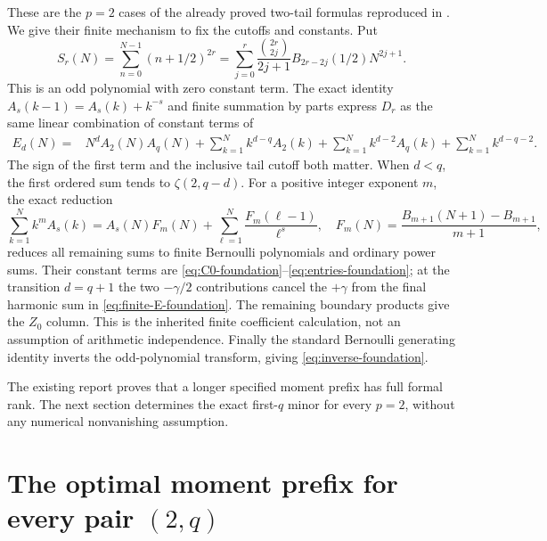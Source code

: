 \documentclass[11pt,a4paper]{article}
\numberwithin{equation}{section}
\theoremstyle{plain}
\theoremstyle{definition}
\theoremstyle{remark}
\begin{document}
These are the $p=2$ cases of the already proved two-tail formulas
reproduced in \cite[Section 7]{CanonicalFifth}. We give their finite
mechanism to fix the cutoffs and constants. Put
\[
 S_r(N)=\sum_{n=0}^{N-1}(n+1/2)^{2r}
       =\sum_{j=0}^r\frac{\binom{2r}{2j}}{2j+1}
                        B_{2r-2j}(1/2)N^{2j+1}.
\]
This is an odd polynomial with zero constant term. The exact identity
$A_s(k-1)=A_s(k)+k^{-s}$ and finite summation by parts express $D_r$
as the same linear combination of constant terms of
\begin{align}\label{eq:finite-E-foundation}
 E_d(N)={}&N^dA_2(N)A_q(N)
 +\sum_{k=1}^N k^{d-q}A_2(k)
 +\sum_{k=1}^N k^{d-2}A_q(k)
 +\sum_{k=1}^N k^{d-q-2}.
\end{align}
The sign of the first term and the inclusive tail cutoff both
matter. When $d<q$, the first ordered sum tends to
$\zeta(2,q-d)$. For a positive integer exponent $m$, the exact reduction
\begin{equation}\label{eq:finite-Faulhaber-foundation}
 \sum_{k=1}^N k^m A_s(k)
 =A_s(N)F_m(N)+\sum_{\ell=1}^N\frac{F_m(\ell-1)}{\ell^s},
 \quad F_m(N)=\frac{B_{m+1}(N+1)-B_{m+1}}{m+1},
\end{equation}
reduces all remaining sums to finite Bernoulli polynomials and
ordinary power sums. Their constant terms are
\eqref{eq:C0-foundation}--\eqref{eq:entries-foundation}; at the
transition $d=q+1$ the two $-\gamma/2$ contributions cancel the
$+\gamma$ from the final harmonic sum in
\eqref{eq:finite-E-foundation}. The remaining boundary products give
the $Z_0$ column. This is the inherited finite coefficient calculation,
not an assumption of arithmetic independence. Finally the standard
Bernoulli generating identity inverts the odd-polynomial transform,
giving \eqref{eq:inverse-foundation}.

The existing report proves that a longer specified moment prefix
has full formal rank. The next section determines the exact first-$q$
minor for every $p=2$, without any numerical nonvanishing assumption.




\section{The optimal moment prefix for every pair \texorpdfstring{$(2,q)$}{(2,q)}}
\label{sec:rank-two}
\end{document}
